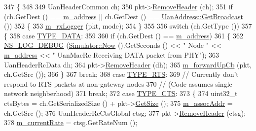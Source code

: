 \begin{DoxyCode}
347 \{
348 
349   UanHeaderCommon ch;
350   pkt->\hyperlink{classns3_1_1Packet_a0961eccf975d75f902d40956c93ba63e}{RemoveHeader} (ch);
351   \textcolor{keywordflow}{if} (ch.GetDest () == \hyperlink{classns3_1_1UanMacRc_ac389a0236fcf75155c45a9a1cdf0f288}{m\_address} || ch.GetDest () == 
      \hyperlink{classns3_1_1UanAddress_ad3b8c69e1408b20f0536a95d70ccbeda}{UanAddress::GetBroadcast} ())
352     \{
353       \hyperlink{classns3_1_1UanMacRc_ac1ad814ae22d6cea426cc5ca46089856}{m\_rxLogger} (pkt, mode);
354     \}
355 
356   \textcolor{keywordflow}{switch} (ch.GetType ())
357     \{
358     \textcolor{keywordflow}{case} \hyperlink{classns3_1_1UanMacRc_ad12bbd636f03943095e1c81cd1cc24b3a21bca93e0670db9a343de5d95ff64092}{TYPE\_DATA}:
359 
360       \textcolor{keywordflow}{if} (ch.GetDest () == \hyperlink{classns3_1_1UanMacRc_ac389a0236fcf75155c45a9a1cdf0f288}{m\_address})
361         \{
362           \hyperlink{group__logging_ga413f1886406d49f59a6a0a89b77b4d0a}{NS\_LOG\_DEBUG} (\hyperlink{classns3_1_1Simulator_ac3178fa975b419f7875e7105be122800}{Simulator::Now} ().GetSeconds () << \textcolor{stringliteral}{" Node "} << 
      \hyperlink{classns3_1_1UanMacRc_ac389a0236fcf75155c45a9a1cdf0f288}{m\_address} << \textcolor{stringliteral}{" UanMacRc Receiving DATA packet from PHY"});
363           UanHeaderRcData dh;
364           pkt->\hyperlink{classns3_1_1Packet_a0961eccf975d75f902d40956c93ba63e}{RemoveHeader} (dh);
365           \hyperlink{classns3_1_1UanMacRc_a5e7c5946407caf5fc03bc328118005c9}{m\_forwardUpCb} (pkt, ch.GetSrc ());
366         \}
367       \textcolor{keywordflow}{break};
368     \textcolor{keywordflow}{case} \hyperlink{classns3_1_1UanMacRc_ad12bbd636f03943095e1c81cd1cc24b3a04488fc6d8b08804abbb178e0af7a6dc}{TYPE\_RTS}:
369       \textcolor{comment}{// Currently don't respond to RTS packets at non-gateway nodes}
370       \textcolor{comment}{// (Code assumes single network neighberhood)}
371       \textcolor{keywordflow}{break};
372     \textcolor{keywordflow}{case} \hyperlink{classns3_1_1UanMacRc_ad12bbd636f03943095e1c81cd1cc24b3a6c74a18f3ef5f623c1301ed43d64eaa6}{TYPE\_CTS}:
373       \{
374         uint32\_t ctsBytes = ch.GetSerializedSize () + pkt->\hyperlink{classns3_1_1Packet_a462855c9929954d4301a4edfe55f4f1c}{GetSize} ();
375         \hyperlink{classns3_1_1UanMacRc_a67110fd422cdfab5b7d3b47fca059916}{m\_assocAddr} = ch.GetSrc ();
376         UanHeaderRcCtsGlobal ctsg;
377         pkt->\hyperlink{classns3_1_1Packet_a0961eccf975d75f902d40956c93ba63e}{RemoveHeader} (ctsg);
378         \hyperlink{classns3_1_1UanMacRc_a994d8477f32862d6fa549e1782a8b699}{m\_currentRate} = ctsg.GetRateNum ();

\end{DoxyCode}
